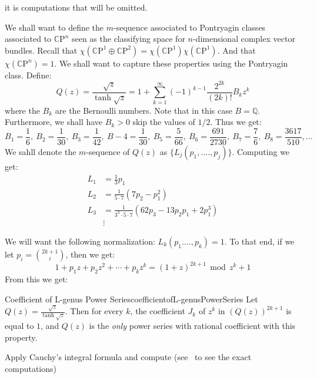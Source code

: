 \documentclass{book}
\newcommand{\Q}{{\mathbb{Q}}}
\newcommand{\CP}{\mathbb{C}\mathrm{P}}
\renewcommand{\mod}{\,\operatorname{mod}\,}
\begin{document}
\begin{Proof}
  it is computations that will be omitted.
\end{Proof}

We shall want to define the $m$-sequence associated to Pontryagin classes associated to $\CP^n$ seen as the
classifying space for $n$-dimensional complex vector bundles. Recall that $\chi(\CP^1\oplus \CP^2)
= \chi(\CP^1)\chi(\CP^1)$. And that $\chi(\CP^n) = 1$. We shall want to capture these properties using the
Pontryagin class. Define:
\[
  Q(z) = \frac{\sqrt{z}}{\tanh{\sqrt{z}}} = 1 + \sum_{k=1}^\infty (-1)^{k-1} \frac{2^{2k}}{(2k)!}B_kz^k
\]
where the $B_k$ are the Bernoulli numbers. Note that in this case $B= \Q$. Furthermore, we shall have $B_k
> 0$ skip the values of $1/2$. Thus we get:
\[
  B_1 = \frac{1}{6},\ B_2 = \frac{1}{30},\ B_3 = \frac{1}{42},\ B-4 = \frac{1}{30},\ B_5 = \frac{5}{66},\ B_6
  = \frac{691}{2730},\ B_7 = \frac{7}{6},\ B_8 = \frac{3617}{510},...
\]
We sahll denote the $m$-sequence of $Q(z)$ as $\{L_j(p_1, ...., p_j)\}$. Computing we get:
\begin{align*}
 L_1 &= \frac{1}{3}p_1\\
 L_2 &= \frac{1}{5\cdot 7}(7p_2 - p_1^2)\\
 L_3 &= \frac{1}{3^3\cdot 5 \cdot 7}(62p_3 - 13p_2p_1 + 2p_1^3)\\
     &\vdots
\end{align*}

We will want the following normalization: $L_k(p_1 ...., p_k) = 1$. To that end, if we let $p_i
= \binom{2k+1}{i}$, then we get:
\[
  1 + p_1z + p_2z^2  +\cdots + p_kz^k = \left(1+z\right)^{2k+1} \mod z^k+1
\]
From this we get:

\begin{prop}{Coefficient of L-genus Power Series}{coefficientofL-genusPowerSeries}
  Let $Q(z) = \frac{\sqrt{z}}{\tanh{\sqrt{z}}}$. Then for every $k$, the coefficient $J_k$ of $z^k$ in
    $(Q(z))^{2k+1}$ is equal to $1$, and $Q(z)$ is the \emph{only} power series with rational coefficient
    with this property.
\end{prop}

\begin{Proof}
  Apply Cauchy's integral formula and compute (see~\cite[p.12]{hirzebruchTopologicalMethodsAlgebraic1995} to
  see the exact computations)
\end{Proof}
\end{document}

